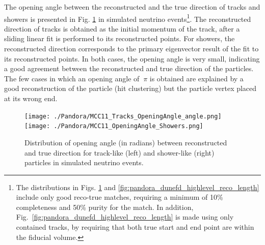 The opening angle between the reconstructed and the true \threed direction of tracks and showers is presented in Fig. \ref{fig:pandora_dunefd_highlevel_reco_angle} in simulated  neutrino events\footnote{The distributions in Figs. \ref{fig:pandora_dunefd_highlevel_reco_angle} and \ref{fig:pandora_dunefd_highlevel_reco_length} include only good reco-true matches, requiring a minimum of 10\% completeness and 50\% purity for the match. In addition, Fig.~\ref{fig:pandora_dunefd_highlevel_reco_length} is made using only contained tracks, by requiring that both true start and end point are within the fiducial volume. }. The reconstructed direction of tracks is obtained as the initial momentum of the track, after a  sliding linear fit is performed to its reconstructed \threed points. For showers, the reconstructed direction corresponds to the primary eigenvector result of the  fit to its reconstructed \threed points. In both cases, the opening angle is very small, indicating a good agreement between the reconstructed and true direction of the particles. The few cases in which an opening angle of $~\pi$ is obtained are explained by a good reconstruction of the particle (hit clustering) but the particle vertex placed at its wrong end. 

\begin{figure}[!ht]
\centering
\texttt{[image: ./Pandora/MCC11\_Tracks\_OpeningAngle\_angle.png]}\texttt{[image: ./Pandora/MCC11\_OpeningAngle\_Showers.png]}
\caption[Distribution of opening angle between reconstructed and true direction for track-like and shower-like particles]{Distribution of opening angle (in radians) between reconstructed and true direction for track-like (left) and shower-like (right) particles in simulated  neutrino events.}
\label{fig:pandora_dunefd_highlevel_reco_angle}
\end{figure}

